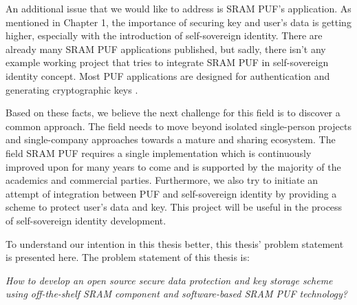 An additional issue that we would like to address is SRAM PUF's application. As mentioned in Chapter 1, the importance of securing key and user's data is getting higher, especially with the introduction of self-sovereign identity. There are already many SRAM PUF applications published, but sadly, there isn't any example working project that tries to integrate SRAM PUF in self-sovereign identity concept. Most PUF applications are designed for authentication \cite{Tuyls2007} \cite{delvaux} \cite{Suh:2007:PUF:1278480.1278484} \cite{10.1007/978-3-642-04474-8_22} \cite{10.1007/978-3-642-10838-9_22} \cite{10.1007/978-3-319-29078-2_5}
and generating cryptographic keys \cite{Suh:2007:PUF:1278480.1278484} \cite{10.1007/978-3-642-33027-8_18}.

Based on these facts, we believe the next challenge for this field is to discover a common approach. The field needs to move beyond isolated single-person projects and single-company approaches towards a mature and sharing ecosystem. The field SRAM PUF requires a single implementation which is continuously improved upon for many years to come and is supported by the majority of the academics and commercial parties.
Furthermore, we also try to initiate an attempt of integration between PUF and self-sovereign identity by providing a scheme to protect user's data and key. This project will be useful in the process of self-sovereign identity development.

To understand our intention in this thesis better, this thesis' problem statement is presented here. The problem statement of this thesis is:

\begin{adjustwidth}{1cm}{1cm}
		\textit{How to develop an open source secure data protection and key storage scheme using off-the-shelf SRAM component and software-based SRAM PUF technology?}
\end{adjustwidth}

